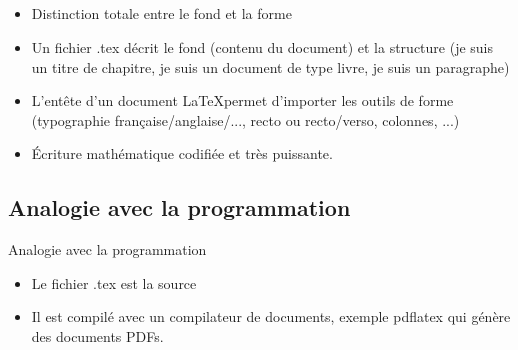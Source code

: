 \subsection{\subsectitle}
\begin{frame}{\sectitle}
    \begin{block}{\subsectitle}
        \begin{itemize}
            \item Distinction totale entre le fond et la forme
            \item Un fichier .tex décrit le fond (contenu du document) et la
                structure (je suis un titre de chapitre, je suis un document de
                type livre, je suis un paragraphe)
            \item L'entête d'un document \LaTeX permet d'importer les outils de
                forme (typographie française/anglaise/..., recto ou recto/verso,
                colonnes, ...)
            \item Écriture mathématique codifiée et très puissante.
        \end{itemize}
    \end{block}


\def\subsectitle{Analogie avec la programmation}
\subsection{\subsectitle}
    \begin{block}{\subsectitle}
        \begin{itemize}
            \item Le fichier .tex est la source 
            \item Il est compilé avec un compilateur de documents, exemple
                pdflatex qui génère des documents PDFs.
        \end{itemize}
    \end{block}
\end{frame}


\def\subsectitle{Travailler avec \LaTeX}
